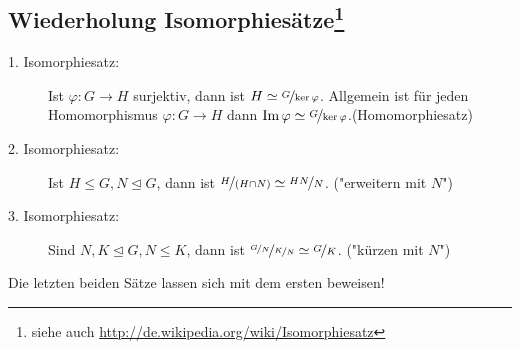 \subsection*{Wiederholung Isomorphiesätze\footnote{siehe auch \url{http://de.wikipedia.org/wiki/Isomorphiesatz}}} %
\label{sub:wiederholung_isomorphiesätze}
\begin{description}
	\item[1. Isomorphiesatz:] Ist $\varphi : G \to H$ surjektiv, dann ist $H \simeq \nicefrac{G}{\ker \varphi}$. Allgemein ist für jeden Homomorphismus $\varphi : G \to H$
	dann $\operatorname{Im} \varphi \simeq \nicefrac{G}{\ker \varphi}$.\hfill {\color{lightgray}(Homomorphiesatz)}
	\item[2. Isomorphiesatz:] Ist $H \le G, N \unlhd G$, dann ist $\nicefrac{H}{(H \cap N)} \simeq \nicefrac{H N}{N}$.\hfill {\color{lightgray} ("{}erweitern mit $N$")}
	\item[3. Isomorphiesatz:] Sind $N,K \unlhd G, N \le K$, dann ist $\nicefrac{\nicefrac{G}{N}}{\nicefrac{K}{N}} \simeq \nicefrac{G}{K}$. \hfill
	{\color{lightgray} ("{}kürzen mit $N$")}
\end{description}
Die letzten beiden Sätze lassen sich mit dem ersten beweisen!

